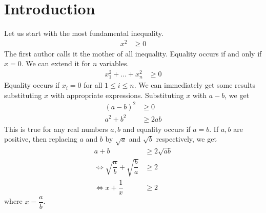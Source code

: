 \documentclass{subfile}
\begin{document}
	\section{Introduction}\label{sec:intro}%
	Let us start with the most fundamental inequality.
		\begin{align}
			x^2
				& \geq0\label{eqn:mother}
		\end{align}
	The first author calls it the mother of all inequality. Equality occurs if and only if $x=0$. We can extend it for $n$ variables.
		\begin{align}
			x_1^2+\ldots+x_n^2
				& \geq0\label{eqn:extendedmother}
		\end{align}
	Equality occurs if $x_i=0$ for all $1\leq i\leq n$. We can immediately get some results substituting $x$ with appropriate expressions. Substituting $x$ with $a-b$, we get
		\begin{align*}
			(a-b)^2
				& \geq0\\
			a^2+b^2
				& \geq2ab
		\end{align*}
	This is true for any real numbers $a,b$ and equality occurs if $a=b$. If $a,b$ are positive, then replacing $a$ and $b$ by $\sqrt{a}$ and $\sqrt{b}$ respectively, we get
		\begin{align*}
			a+b
				& \geq2\sqrt{ab}\\
			\iff\sqrt{\dfrac{a}{b}}+\sqrt{\dfrac{b}{a}}
				& \geq2\\
			\iff x+\dfrac{1}{x}
				& \geq2
		\end{align*}
	where $x=\dfrac{a}{b}$.
\end{document}
